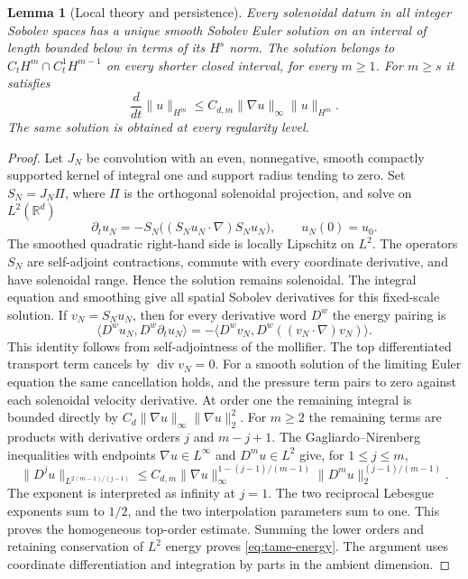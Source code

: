 \documentclass[11pt]{article}
\newcommand{\R}{\mathbb R}
\newtheorem{lemma}[theorem]{Lemma}
\theoremstyle{definition}
\begin{document}
\begin{lemma}[Local theory and persistence]\label{lem:local}
Every solenoidal datum in all integer Sobolev spaces has a unique smooth
Sobolev Euler solution on an interval of length bounded below in terms of
its $H^s$ norm. The solution belongs to
$C_tH^m\cap C^1_tH^{m-1}$ on every shorter closed interval, for every
$m\geq1$. For $m\geq s$ it satisfies
\begin{equation}\label{eq:tame-energy}
 \frac{d}{dt}\|u\|_{H^m}\leq C_{d,m}\|\nabla u\|_\infty\|u\|_{H^m}.
\end{equation}
The same solution is obtained at every regularity level.
\end{lemma}
\begin{proof}
Let $J_N$ be convolution with an even, nonnegative, smooth compactly
supported kernel of integral one and support radius tending to zero.
Set $S_N=J_N\Pi$, where $\Pi$ is the orthogonal solenoidal projection,
and solve on $L^2(\R^d)$
\[
 \partial_tu_N=-S_N\bigl((S_Nu_N\cdot\nabla)S_Nu_N\bigr),
 \qquad u_N(0)=u_0.
\]
The smoothed quadratic right-hand side is locally Lipschitz on $L^2$.
The operators $S_N$ are self-adjoint contractions, commute with every
coordinate derivative, and have solenoidal range. Hence the solution
remains solenoidal. The integral equation and smoothing give all spatial
Sobolev derivatives for this fixed-scale solution. If $v_N=S_Nu_N$,
then for every derivative word $D^w$ the energy pairing is
\[
 \langle D^wu_N,D^w\partial_tu_N\rangle
 =-\langle D^wv_N,D^w((v_N\cdot\nabla)v_N)\rangle.
\]
This identity follows from self-adjointness of the mollifier.
The top differentiated transport term cancels by $\operatorname{div}v_N=0$.
For a smooth solution of the limiting Euler equation the same cancellation
holds, and the pressure term pairs to zero against each solenoidal
velocity derivative.
At order one the remaining integral is bounded directly by
$C_d\|\nabla u\|_\infty\|\nabla u\|_2^2$. For $m\geq2$ the
remaining terms are products with derivative orders $j$ and $m-j+1$. The Gagliardo--Nirenberg inequalities with endpoints
$\nabla u\in L^\infty$ and $D^m u\in L^2$ give, for $1\leq j\leq m$,
\[
 \|D^j u\|_{L^{2(m-1)/(j-1)}}
 \leq C_{d,m}\|\nabla u\|_\infty^{1-(j-1)/(m-1)}
                 \|D^m u\|_2^{(j-1)/(m-1)}.
\]
The exponent is interpreted as infinity at $j=1$. The two reciprocal
Lebesgue exponents sum to $1/2$, and the two interpolation parameters
sum to one. This proves the homogeneous top-order estimate. Summing the
lower orders and retaining conservation of $L^2$ energy proves
\eqref{eq:tame-energy}. The argument uses coordinate differentiation and integration by parts
in the ambient dimension.


\end{proof}
\end{document}
